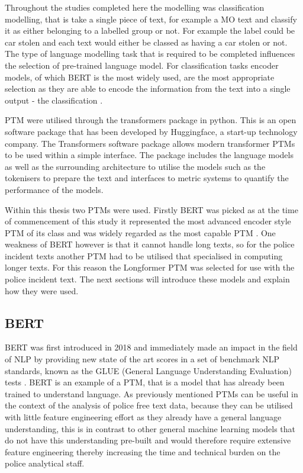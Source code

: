Throughout the studies completed here the modelling was classification modelling, that is take a single piece of text, for example a MO text and classify it as either belonging to a labelled group or not. For example the label could be car stolen and each text would either be classed as having a car stolen or not. The type of language modelling task that is required to be completed influences the selection of pre-trained language model. For classification tasks encoder models, of which BERT is the most widely used, are the most appropriate selection as they are able to encode the information from the text into a single output - the classification \parencite{PTMsurvey}. 

PTM were utilised through the transformers package \parencite{wolf2019huggingface} in python. This is an open software package that has been developed by Huggingface, a start-up technology company. The Transformers software package allows modern transformer PTMs to be used within a simple interface. The package includes the language models as well as the surrounding architecture to utilise the models such as the tokenisers to prepare the text and interfaces to metric systems to quantify the performance of the models.

Within this thesis two PTMs were used. Firstly BERT was picked as at the time of commencement of this study it represented the most advanced encoder style PTM of its class and was widely regarded as the most capable PTM \parencite{PTMsurvey}. One weakness of BERT however is that it cannot handle long texts, so for the police incident texts another PTM had to be utilised that specialised in computing longer texts. For this reason the Longformer PTM was selected for use with the police incident text. The next sections will introduce these models and explain how they were used.

\subsection{BERT} BERT was first introduced in 2018 \parencite{devlin2018bert} and immediately made an impact in the field of NLP by providing new state of the art scores in a set of benchmark NLP standards, known as the GLUE (General Language Understanding Evaluation) tests \parencite{wang2018glue}. BERT is an example of a PTM, that is a model that has already been trained to understand language. As previously mentioned PTMs can be useful in the context of the analysis of police free text data, because they can be utilised with little feature engineering effort as they already have a general language understanding, this is in contrast to other general machine learning models that do not have this understanding pre-built and would therefore require extensive feature engineering thereby increasing the time and technical burden on the police analytical staff. 

